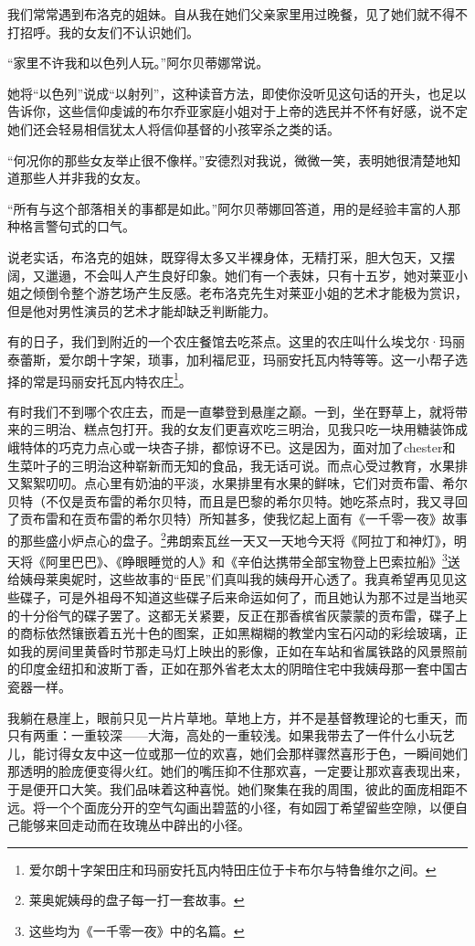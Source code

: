 \par 我们常常遇到布洛克的姐妹。自从我在她们父亲家里用过晚餐，见了她们就不得不打招呼。我的女友们不认识她们。
\par “家里不许我和以色列人玩。”阿尔贝蒂娜常说。
\par 她将“以色列”说成“以射列”，这种读音方法，即使你没听见这句话的开头，也足以告诉你，这些信仰虔诚的布尔乔亚家庭小姐对于上帝的选民并不怀有好感，说不定她们还会轻易相信犹太人将信仰基督的小孩宰杀之类的话。
\par “何况你的那些女友举止很不像样。”安德烈对我说，微微一笑，表明她很清楚地知道那些人并非我的女友。
\par “所有与这个部落相关的事都是如此。”阿尔贝蒂娜回答道，用的是经验丰富的人那种格言警句式的口气。
\par 说老实话，布洛克的姐妹，既穿得太多又半裸身体，无精打采，胆大包天，又摆阔，又邋遢，不会叫人产生良好印象。她们有一个表妹，只有十五岁，她对莱亚小姐之倾倒令整个游艺场产生反感。老布洛克先生对莱亚小姐的艺术才能极为赏识，但是他对男性演员的艺术才能却缺乏判断能力。
\par 有的日子，我们到附近的一个农庄餐馆去吃茶点。这里的农庄叫什么埃戈尔·玛丽泰蕾斯，爱尔朗十字架，琐事，加利福尼亚，玛丽安托瓦内特等等。这一小帮子选择的常是玛丽安托瓦内特农庄\footnote{爱尔朗十字架田庄和玛丽安托瓦内特田庄位于卡布尔与特鲁维尔之间。}。
\par 有时我们不到哪个农庄去，而是一直攀登到悬崖之巅。一到，坐在野草上，就将带来的三明治、糕点包打开。我的女友们更喜欢吃三明治，见我只吃一块用糖装饰成峨特体的巧克力点心或一块杏子排，都惊讶不已。这是因为，面对加了chester和生菜叶子的三明治这种崭新而无知的食品，我无话可说。而点心受过教育，水果排又絮絮叨叨。点心里有奶油的平淡，水果排里有水果的鲜味，它们对贡布雷、希尔贝特（不仅是贡布雷的希尔贝特，而且是巴黎的希尔贝特。她吃茶点时，我又寻回了贡布雷和在贡布雷的希尔贝特）所知甚多，使我忆起上面有《一千零一夜》故事的那些盛小炉点心的盘子。\footnote{莱奥妮姨母的盘子每一打一套故事。}弗朗索瓦丝一天又一天地今天将《阿拉丁和神灯》，明天将《阿里巴巴》、《睁眼睡觉的人》和《辛伯达携带全部宝物登上巴索拉船》\footnote{这些均为《一千零一夜》中的名篇。}送给姨母莱奥妮时，这些故事的“臣民”们真叫我的姨母开心透了。我真希望再见见这些碟子，可是外祖母不知道这些碟子后来命运如何了，而且她认为那不过是当地买的十分俗气的碟子罢了。这都无关紧要，反正在那香槟省灰蒙蒙的贡布雷，碟子上的商标依然镶嵌着五光十色的图案，正如黑糊糊的教堂内宝石闪动的彩绘玻璃，正如我的房间里黄昏时节那走马灯上映出的影像，正如在车站和省属铁路的风景照前的印度金纽扣和波斯丁香，正如在那外省老太太的阴暗住宅中我姨母那一套中国古瓷器一样。
\par 我躺在悬崖上，眼前只见一片片草地。草地上方，并不是基督教理论的七重天，而只有两重：一重较深——大海，高处的一重较浅。如果我带去了一件什么小玩艺儿，能讨得女友中这一位或那一位的欢喜，她们会那样骤然喜形于色，一瞬间她们那透明的脸庞便变得火红。她们的嘴压抑不住那欢喜，一定要让那欢喜表现出来，于是便开口大笑。我们品味着这种喜悦。她们聚集在我的周围，彼此的面庞相距不远。将一个个面庞分开的空气勾画出碧蓝的小径，有如园丁希望留些空隙，以便自己能够来回走动而在玫瑰丛中辟出的小径。
